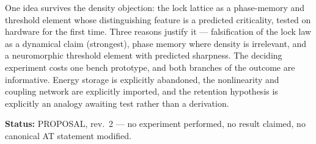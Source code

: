 \documentclass[11pt,a4paper]{article}
\begin{document}
One idea survives the density objection: the lock lattice as a phase-memory and threshold element
whose distinguishing feature is a predicted criticality, tested on hardware for the first time.
Three reasons justify it --- falsification of the lock law as a dynamical claim (strongest), phase
memory where density is irrelevant, and a neuromorphic threshold element with predicted sharpness.
The deciding experiment costs one bench prototype, and both branches of the outcome are informative.
Energy storage is explicitly abandoned, the nonlinearity and coupling network are explicitly
imported, and the retention hypothesis is explicitly an analogy awaiting test rather than a
derivation.

\bigskip
\noindent\textbf{Status:} PROPOSAL, rev.\ 2 --- no experiment performed, no result claimed, no
canonical AT statement modified.
\end{document}
